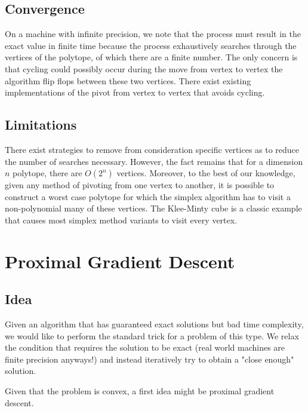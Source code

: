 \documentclass[letterpaper,twocolumn,12pt]{article}
\begin{document}
\subsection{Convergence}
On a machine with
infinite precision, we note that the process must result in the exact value in
finite time because the process exhaustively searches through the vertices of the
polytope, of which there are a finite number. The only concern is that cycling
could possibly occur during the move from vertex to vertex the algorithm flip flops between these two vertices.
There exist existing implementations of the pivot from vertex to vertex that avoids
cycling\cite{Pivot}.

\subsection{Limitations}
There exist strategies to remove from consideration specific vertices as to reduce the
number of searches necessary.
However, the fact remains that for a dimension
$n$ polytope, there are $O(2^n)$ vertices. Moreover, to the best of our knowledge,
given any method of pivoting from one vertex to another, it is possible to construct
a worst case polytope for which the simplex algorithm has to visit a non-polynomial many
of these vertices. The Klee-Minty cube is a classic example that causes most simplex
method variants to visit every vertex\cite{Minty}.

\section{Proximal Gradient Descent}
\subsection{Idea}
Given an algorithm that has guaranteed exact solutions but bad time complexity,
we would like to perform the standard trick for a problem of this type. We relax the
condition that requires the solution to be exact (real world machines are finite
precision anyways!) and instead iteratively try to obtain a "close enough" solution.

Given that the problem is convex, a first idea might be proximal gradient descent.
\end{document}
